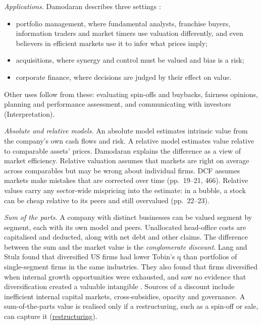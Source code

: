\begin{qfmethod}\label{meth:valuation-approach-choice}
 \emph{Applications.} Damodaran describes three settings \citep[pp.~6--8]{investment-valuation-2012}:
\begin{itemize}
\item portfolio management, where fundamental analysts, franchise buyers, information traders and market timers use valuation differently, and even believers in efficient markets use it to infer what prices imply;
\item acquisitions, where synergy and control must be valued and bias is a risk;
\item corporate finance, where decisions are judged by their effect on value.
\end{itemize}
Other uses follow from these: evaluating spin-offs and buybacks, fairness opinions, planning and performance assessment, and communicating with investors (Interpretation).

\emph{Absolute and relative models.} An absolute model estimates intrinsic value from the company's own cash flows and risk. A relative model estimates value relative to comparable assets' prices. Damodaran explains the difference as a view of market efficiency. Relative valuation assumes that markets are right on average across comparables but may be wrong about individual firms. DCF assumes markets make mistakes that are corrected over time (pp.~19--21, 466). Relative values carry any sector-wide mispricing into the estimate: in a bubble, a stock can be cheap relative to its peers and still overvalued (pp.~22--23).

\emph{Sum of the parts.} A company with distinct businesses can be valued segment by segment, each with its own model and peers. Unallocated head-office costs are capitalised and deducted, along with net debt and other claims. The difference between the sum and the market value is the \emph{conglomerate discount}. Lang and Stulz found that diversified US firms had lower Tobin's q than portfolios of single-segment firms in the same industries. They also found that firms diversified when internal growth opportunities were exhausted, and saw no evidence that diversification created a valuable intangible \citep[pp.~2--3]{lang-stulz-1993}. Sources of a discount include inefficient internal capital markets, cross-subsidies, opacity and governance. A sum-of-the-parts value is realised only if a restructuring, such as a spin-off or sale, can capture it (\hyperref[meth:restructuring-evaluation]{restructuring}).


\end{qfmethod}
